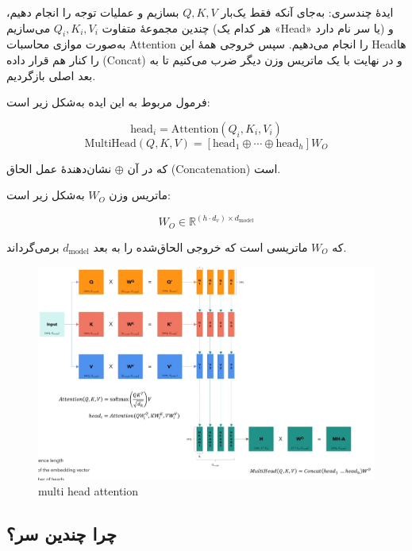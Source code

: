 ایدهٔ چندسری:  
به‌جای آنکه فقط یک‌بار \( Q, K, V \) بسازیم و عملیات توجه را انجام دهیم، چندین مجموعهٔ متفاوت \( Q_i, K_i, V_i \) می‌سازیم (هر کدام یک «Head» یا سر نام دارد) و به‌صورت موازی محاسبات Attention را انجام می‌دهیم. سپس خروجی همهٔ این Headها را کنار هم قرار داده (Concat) و در نهایت با یک ماتریس وزن دیگر ضرب می‌کنیم تا به بعد اصلی بازگردیم.

فرمول مربوط به این ایده به‌شکل زیر است:

\[
\text{head}_i = \text{Attention}(Q_i, K_i, V_i)
\]
\[
\text{MultiHead}(Q, K, V) = [\text{head}_1 \oplus \cdots \oplus \text{head}_h] W_O
\]

که در آن \( \oplus \) نشان‌دهندهٔ عمل الحاق (Concatenation) است.

ماتریس وزن \( W_O \) به‌شکل زیر است:

\[
W_O \in \mathbb{R}^{(h \cdot d_v) \times d_{\text{model}}}
\]

که \( W_O \) ماتریسی است که خروجی الحاق‌شده را به بعد \( d_{\text{model}} \) برمی‌گرداند.





\begin{figure}[h]
	\centering
	\begin{minipage}[b]{0.9\textwidth}
		\centering
		\includegraphics[width=\textwidth]{transformer_images/multi_head_attention.png}
		\caption{multi head attention}
		\label{fig:attention}
	\end{minipage}
	\hfill
	
\end{figure}



\subsection*{چرا چندین سر؟}

